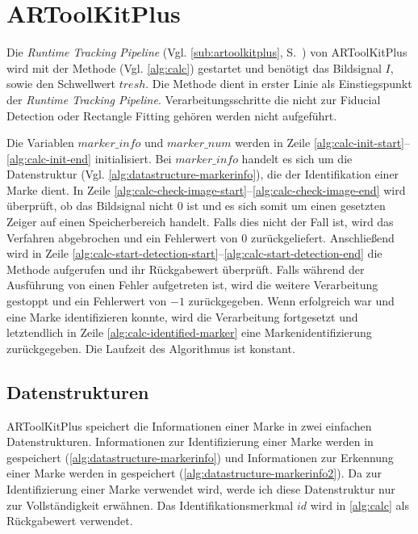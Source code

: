 \section{ARToolKitPlus} %
\label{sec:artoolkitplus}

Die \textit{Runtime Tracking Pipeline} (Vgl. \autoref{sub:artoolkitplus}, S.~\pageref{sub:artoolkitplus}) von
 ARToolKitPlus wird mit der Methode  (Vgl. \autoref{alg:calc}) gestartet und benötigt das Bildsignal
 $I$, sowie den Schwellwert $\mathit{tresh}$. Die Methode  dient in erster Linie als Einstiegspunkt der
 \textit{Runtime Tracking Pipeline}. Verarbeitungsschritte die nicht zur Fiducial Detection oder Rectangle
 Fitting gehören werden nicht aufgeführt.



Die Variablen $\mathit{marker\_info}$ und $\mathit{marker\_num}$ werden in Zeile
 \ref{alg:calc-init-start}--\ref{alg:calc-init-end} initialisiert. Bei $\mathit{marker\_info}$ handelt es sich um die
 Datenstruktur  (Vgl. \autoref{alg:datastructure-markerinfo}), die der Identifikation einer Marke
 dient. In Zeile \ref{alg:calc-check-image-start}--\ref{alg:calc-check-image-end} wird überprüft, ob das Bildsignal
 nicht $0$ ist und es sich somit um einen gesetzten Zeiger auf einen Speicherbereich handelt. Falls dies nicht der Fall
 ist, wird das Verfahren abgebrochen und ein Fehlerwert von $0$ zurückgeliefert. Anschließend wird in Zeile
 \ref{alg:calc-start-detection-start}--\ref{alg:calc-start-detection-end} die Methode 
 aufgerufen und ihr Rückgabewert überprüft. Falls während der Ausführung von  einen Fehler
 aufgetreten ist, wird die weitere Verarbeitung gestoppt und ein Fehlerwert von $-1$ zurückgegeben. Wenn
  erfolgreich war und eine Marke identifizieren konnte, wird die Verarbeitung fortgesetzt und
 letztendlich in Zeile \ref{alg:calc-identified-marker} eine Markenidentifizierung zurückgegeben. Die Laufzeit des
 Algorithmus ist konstant.

\subsection{Datenstrukturen} %
\label{sec:datenstrukturen}

ARToolKitPlus speichert die Informationen einer Marke in zwei einfachen Datenstrukturen. Informationen zur
 Identifizierung einer Marke werden in  gespeichert (\autoref{alg:datastructure-markerinfo}) und
 Informationen zur Erkennung einer Marke werden in  gespeichert
 (\autoref{alg:datastructure-markerinfo2}). Da  zur Identifizierung einer Marke verwendet wird,
 werde ich diese Datenstruktur nur zur Vollständigkeit erwähnen. Das Identifikationsmerkmal $\mathit{id}$ wird in
 \autoref{alg:calc} als Rückgabewert verwendet.

